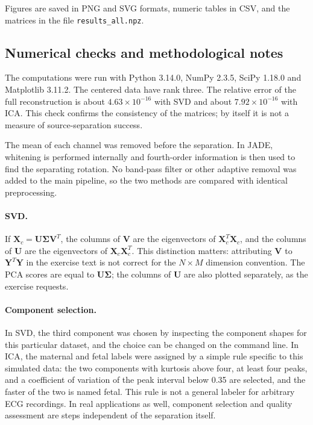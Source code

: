 Figures are saved in PNG and SVG formats, numeric tables in CSV, and the matrices in the file \texttt{results\_all.npz}.

\subsection*{Numerical checks and methodological notes}

The computations were run with Python 3.14.0, NumPy 2.3.5, SciPy 1.18.0 and Matplotlib 3.11.2. The centered data have rank three. The relative error of the full reconstruction is about $4.63\times10^{-16}$ with SVD and about $7.92\times10^{-16}$ with ICA. This check confirms the consistency of the matrices; by itself it is not a measure of source-separation success.

The mean of each channel was removed before the separation. In JADE, whitening is performed internally and fourth-order information is then used to find the separating rotation. No band-pass filter or other adaptive removal was added to the main pipeline, so the two methods are compared with identical preprocessing.

\paragraph{SVD.} If $\mathbf{X}_c = \mathbf{U}\bm{\Sigma}\mathbf{V}^{T}$, the columns of $\mathbf{V}$ are the eigenvectors of $\mathbf{X}_c^{T}\mathbf{X}_c$, and the columns of $\mathbf{U}$ are the eigenvectors of $\mathbf{X}_c\mathbf{X}_c^{T}$. This distinction matters: attributing $\mathbf{V}$ to $\mathbf{Y}^{T}\mathbf{Y}$ in the exercise text is not correct for the $N\times M$ dimension convention. The PCA scores are equal to $\mathbf{U}\bm{\Sigma}$; the columns of $\mathbf{U}$ are also plotted separately, as the exercise requests.

\paragraph{Component selection.} In SVD, the third component was chosen by inspecting the component shapes for this particular dataset, and the choice can be changed on the command line. In ICA, the maternal and fetal labels were assigned by a simple rule specific to this simulated data: the two components with kurtosis above four, at least four peaks, and a coefficient of variation of the peak interval below 0.35 are selected, and the faster of the two is named fetal. This rule is not a general labeler for arbitrary ECG recordings. In real applications as well, component selection and quality assessment are steps independent of the separation itself.
